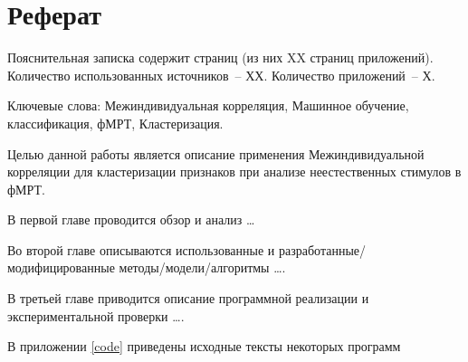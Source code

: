 \chapter*{Реферат}

Пояснительная записка содержит страниц (из них XX страниц приложений).   Количество использованных источников~-- ХХ. Количество приложений~-- Х.

Ключевые слова: Межиндивидуальная корреляция, Машинное обучение, классификация, фМРТ, Кластеризация.

Целью данной работы является описание применения Межиндивидуальной корреляции для кластеризации признаков при анализе неестественных стимулов в фМРТ.

В первой главе проводится обзор и анализ \dots 

Во второй главе описываются использованные и разработанные/модифицированные методы/модели/алгоритмы \dots. 

В третьей главе приводится описание программной реализации и экспериментальной проверки \dots.

В приложении \ref{code} приведены исходные тексты некоторых программ
